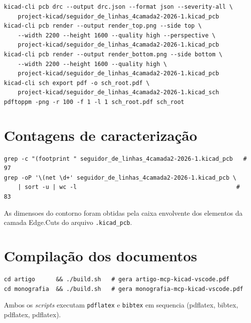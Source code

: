 \begin{verbatim}
kicad-cli pcb drc --output drc.json --format json --severity-all \
    project-kicad/seguidor_de_linhas_4camada2-2026-1.kicad_pcb
kicad-cli pcb render --output render_top.png --side top \
    --width 2200 --height 1600 --quality high --perspective \
    project-kicad/seguidor_de_linhas_4camada2-2026-1.kicad_pcb
kicad-cli pcb render --output render_bottom.png --side bottom \
    --width 2200 --height 1600 --quality high \
    project-kicad/seguidor_de_linhas_4camada2-2026-1.kicad_pcb
kicad-cli sch export pdf -o sch_root.pdf \
    project-kicad/seguidor_de_linhas_4camada2-2026-1.kicad_sch
pdftoppm -png -r 100 -f 1 -l 1 sch_root.pdf sch_root
\end{verbatim}

\section{Contagens de caracterização}

\begin{verbatim}
grep -c "(footprint " seguidor_de_linhas_4camada2-2026-1.kicad_pcb   # 97
grep -oP '\(net \d+' seguidor_de_linhas_4camada2-2026-1.kicad_pcb \
    | sort -u | wc -l                                              # 83
\end{verbatim}

As dimensoes do contorno foram obtidas pela caixa envolvente dos elementos
da camada Edge.Cuts do arquivo \texttt{.kicad\_pcb}.

\section{Compilação dos documentos}

\begin{verbatim}
cd artigo      && ./build.sh   # gera artigo-mcp-kicad-vscode.pdf
cd monografia  && ./build.sh   # gera monografia-mcp-kicad-vscode.pdf
\end{verbatim}

Ambos os \emph{scripts} executam \texttt{pdflatex} e \texttt{bibtex} em
sequencia (pdflatex, bibtex, pdflatex, pdflatex).

